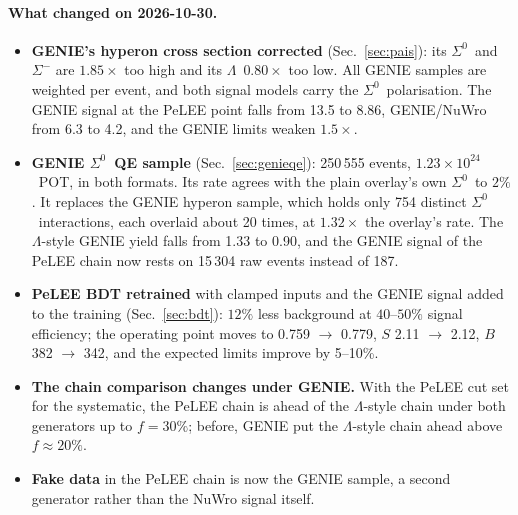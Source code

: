 \documentclass[11pt,a4paper]{article}
\newcommand{\Szero}{\ensuremath{\Sigma^{0}}}
\newcommand{\Lam}{\ensuremath{\Lambda}}
\begin{document}
\paragraph{What changed on 2026-10-30.}
\begin{itemize}
  \item \textbf{GENIE's hyperon cross section corrected} (Sec.~\ref{sec:pais}): its
        \Szero\ and $\Sigma^-$ are $1.85\times$ too high and its \Lam\ $0.80\times$ too
        low. All GENIE samples are weighted per event, and both signal models carry the
        \Szero\ polarisation. The GENIE signal at the PeLEE point falls from 13.5 to
        8.86, GENIE/NuWro from 6.3 to 4.2, and the GENIE limits weaken $1.5\times$.
  \item \textbf{GENIE \Szero\ QE sample} (Sec.~\ref{sec:genieqe}): 250\,555 events,
        $1.23\times10^{24}$~POT, in both formats. Its rate agrees with the plain
        overlay's own \Szero\ to $2\%$. It replaces the GENIE hyperon sample, which
        holds only 754 distinct \Szero\ interactions, each overlaid about 20 times, at
        $1.32\times$ the overlay's rate. The \Lam-style GENIE yield falls from 1.33 to
        0.90, and the GENIE signal of the PeLEE chain now rests on 15\,304 raw events
        instead of 187.
  \item \textbf{PeLEE BDT retrained} with clamped inputs and the GENIE signal added to
        the training (Sec.~\ref{sec:bdt}): $12\%$ less background at $40$--$50\%$ signal
        efficiency; the operating point moves to 0.759 $\to$ 0.779, $S$ 2.11 $\to$ 2.12,
        $B$ 382 $\to$ 342, and the expected limits improve by 5--10\%.
  \item \textbf{The chain comparison changes under GENIE.} With the PeLEE cut set for
        the systematic, the PeLEE chain is ahead of the \Lam-style chain under both
        generators up to $f=30\%$; before, GENIE put the \Lam-style chain ahead above
        $f\approx20\%$.
  \item \textbf{Fake data} in the PeLEE chain is now the GENIE sample, a second
        generator rather than the NuWro signal itself.
\end{itemize}
\end{document}
